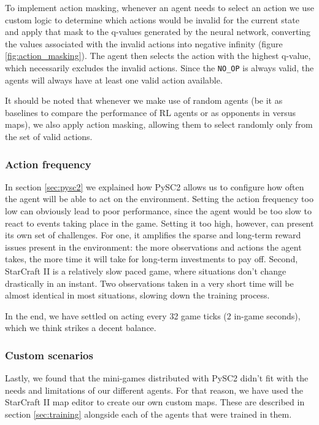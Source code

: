 To implement action masking, whenever an agent needs to select an action we use custom logic to determine which actions would be invalid for the current state and apply that mask to the q-values generated by the neural network, converting the values associated with the invalid actions into negative infinity (figure \ref{fig:action_masking}). The agent then selects the action with the highest q-value, which necessarily excludes the invalid actions. Since the \texttt{NO\_OP} is always valid, the agents will always have at least one valid action available.

It should be noted that whenever we make use of random agents (be it as baselines to compare the performance of RL agents or as opponents in versus maps), we also apply action masking, allowing them to select randomly only from the set of valid actions.

\subsubsection*{Action frequency}

In section \ref{sec:pysc2} we explained how PySC2 allows us to configure how often the agent will be able to act on the environment. Setting the action frequency too low can obviously lead to poor performance, since the agent would be too slow to react to events taking place in the game. Setting it too high, however, can present its own set of challenges. For one, it amplifies the sparse and long-term reward issues present in the environment: the more observations and actions the agent takes, the more  time it will take for long-term investments to pay off. Second, StarCraft II is a relatively slow paced game, where situations don't change drastically in an instant. Two observations taken in a very short time will be almost identical in most situations, slowing down the training process.

In the end, we have settled on acting every 32 game ticks (2 in-game seconds), which we think strikes a decent balance.

\subsubsection*{Custom scenarios}

Lastly, we found that the mini-games distributed with PySC2 didn't fit with the needs and limitations of our different agents. For that reason, we have used the StarCraft II map editor to create our own custom maps. These are described in section \ref{sec:training} alongside each of the agents that were trained in them.

